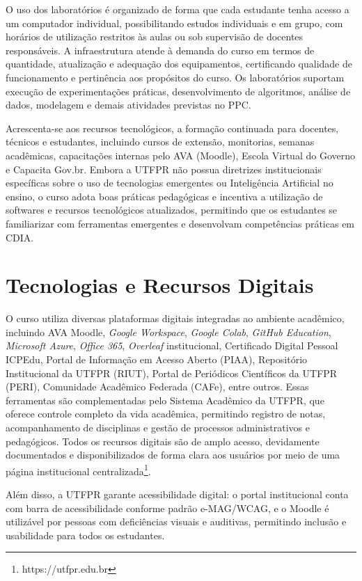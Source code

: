 O uso dos laboratórios é organizado de forma que cada estudante tenha acesso a um computador individual, possibilitando estudos individuais e em grupo, com horários de utilização restritos às aulas ou sob supervisão de docentes responsáveis. A infraestrutura atende à demanda do curso em termos de quantidade, atualização e adequação dos equipamentos, certificando qualidade de funcionamento e pertinência aos propósitos do curso. Os laboratórios suportam execução de experimentações práticas, desenvolvimento de algoritmos, análise de dados, modelagem e demais atividades previstas no PPC.

Acrescenta-se aos recursos tecnológicos, a formação continuada para docentes, técnicos e estudantes, incluindo cursos de extensão, monitorias, semanas acadêmicas, capacitações internas pelo AVA (Moodle), Escola Virtual do Governo e Capacita Gov.br. Embora a UTFPR não possua diretrizes institucionais específicas sobre o uso de tecnologias emergentes ou Inteligência Artificial no ensino, o curso adota boas práticas pedagógicas e incentiva a utilização de softwares e recursos tecnológicos atualizados, permitindo que os estudantes se familiarizar com ferramentas emergentes e desenvolvam competências práticas em CDIA.


\section{Tecnologias e Recursos Digitais}

O curso utiliza diversas plataformas digitais integradas ao ambiente acadêmico, incluindo AVA Moodle, \textit{Google Workspace}, \textit{Google Colab}, \textit{GitHub Education}, \textit{Microsoft Azure}, \textit{Office 365}, \textit{Overleaf} institucional, Certificado Digital Pessoal ICPEdu, Portal de Informação em Acesso Aberto (PIAA), Repositório Institucional da UTFPR (RIUT), Portal de Periódicos Científicos da UTFPR (PERI), Comunidade Acadêmico Federada (CAFe), entre outros. Essas ferramentas são complementadas pelo Sistema Acadêmico da UTFPR, que oferece controle completo da vida acadêmica, permitindo registro de notas, acompanhamento de disciplinas e gestão de processos administrativos e pedagógicos. Todos os recursos digitais são de amplo acesso, devidamente documentados e disponibilizados de forma clara aos usuários por meio de uma página institucional centralizada\footnote{https://utfpr.edu.br}.

Além disso, a UTFPR garante acessibilidade digital: o portal institucional conta com barra de acessibilidade conforme padrão e-MAG/WCAG, e o Moodle é utilizável por pessoas com deficiências visuais e auditivas, permitindo inclusão e usabilidade para todos os estudantes.

